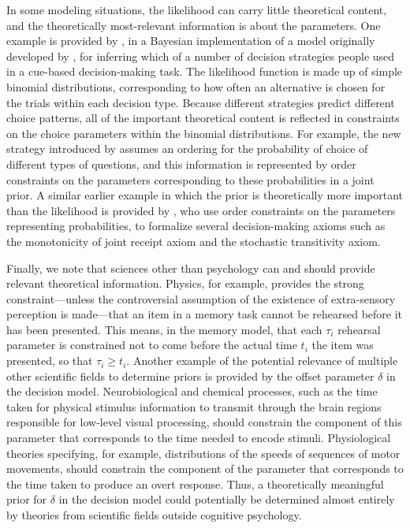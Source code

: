 In some modeling situations, the likelihood can carry little theoretical content, and the theoretically most-relevant information is about the parameters. One example is provided by , in a Bayesian implementation of a model originally developed by , for inferring which of a number of decision strategies people used in a cue-based decision-making task. The likelihood function is made up of simple binomial distributions, corresponding to how often an alternative is chosen for the trials within each decision type. Because different strategies predict different choice patterns, all of the important theoretical content is reflected in constraints on the choice parameters within the binomial distributions. For example, the new strategy introduced by  assumes an ordering for the probability of choice of different types of questions, and this information is represented by order constraints on the parameters corresponding to these probabilities in a joint prior. A similar earlier example in which the prior is theoretically more important than the likelihood is provided by , who use order constraints on the parameters representing probabilities, to formalize several decision-making axioms such as the monotonicity of joint receipt axiom and the stochastic transitivity axiom.

Finally, we note that sciences other than psychology can and should provide relevant theoretical information. Physics, for example, provides the strong constraint---unless the controversial assumption of the existence of extra-sensory perception is made---that an item in a memory task cannot be rehearsed before it has been presented. This means, in the memory model, that each $\tau_i$ rehearsal parameter is constrained not to come before the actual time $t_i$ the item was presented, so that $\tau_i \geq t_i$. Another example of the potential relevance of multiple other scientific fields to determine priors is provided by the offset parameter $\delta$ in the decision model. Neurobiological and chemical processes, such as the time taken for physical stimulus information to transmit through the brain regions responsible for low-level visual processing, should constrain the component of this parameter that corresponds to the time needed to encode stimuli. Physiological theories specifying, for example, distributions of the speeds of sequences of motor movements, should constrain the component of the parameter that corresponds to the time taken to produce an overt response. Thus, a theoretically meaningful prior for $\delta$ in the decision model could potentially be determined almost entirely by theories from scientific fields outside cognitive psychology. 

